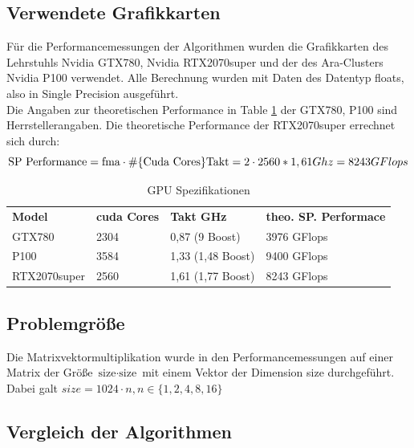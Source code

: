 \documentclass[10pt,a4paper]{article}
\begin{document}
	 \subsection{Verwendete Grafikkarten}
	 Für die Performancemessungen der Algorithmen wurden die Grafikkarten des Lehrstuhls Nvidia GTX780, Nvidia RTX2070super und der des Ara-Clusters Nvidia P100 verwendet. Alle Berechnung wurden mit Daten des Datentyp floats, also in Single Precision ausgeführt.\\
	 Die Angaben zur theoretischen Performance in Table \ref{GPU Daten} der GTX780, P100 sind Herrstellerangaben. Die theoretische Performance der RTX2070super errechnet sich durch: $$\text{SP Performance}= \text{fma}\cdot \# \{\text{Cuda Cores}\} \text{Takt}\\
	 =2\cdot 2560*1,61 Ghz\\
	 =8243 GFlops$$
	 \begin{table}
	 	\centering
	 	\begin{tabular}{llll}
	 		\textbf{Model}  & \textbf{cuda Cores} & \textbf{Takt GHz}  & \textbf{theo. SP. Performace} \\
	 		GTX780           & 2304       & 0,87 (9 Boost) & 3976 GFlops   \\
	 		P100       & 3584 & 1,33 (1,48 Boost) &9400     GFlops        \\
	 		RTX2070super        & 2560 & 1,61 (1,77 Boost) &   8243 GFlops         \\
	 	\end{tabular}
	 	
	 	\caption{GPU Spezifikationen}
	 	\label{GPU Daten}
	 	
	 \end{table}
 	\subsection{Problemgröße}
 	Die Matrixvektormultiplikation wurde in den Performancemessungen auf einer Matrix der Größe $\text{size}\cdot \text{size}$ mit einem Vektor der Dimension size durchgeführt. Dabei galt $size=1024 \cdot n, n\in\{1,2,4,8,16\}$
	 \subsection{Vergleich der Algorithmen}
\end{document}
